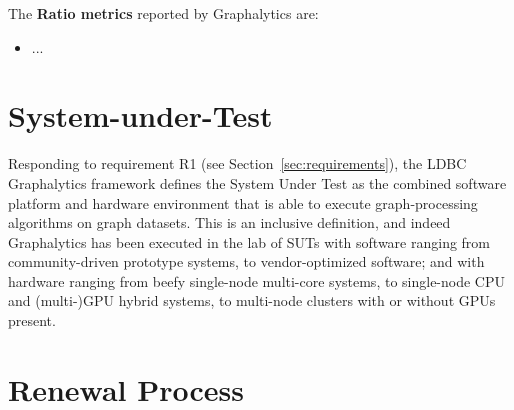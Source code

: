 The {\bf Ratio metrics} reported by Graphalytics are:

\begin{itemize}
	\item ...
\end{itemize}











\section{System-under-Test} \label{sec:sut}

Responding to requirement R1 (see Section~\ref{sec:requirements}), the LDBC Graphalytics framework defines the System Under Test as the combined software platform and hardware environment that is able to execute graph-processing algorithms on graph datasets. This is an inclusive definition, and indeed Graphalytics has been executed in the lab of SUTs with software ranging from community-driven prototype systems, to vendor-optimized software; and with hardware ranging from beefy single-node multi-core systems, to single-node CPU and (multi-)GPU hybrid systems, to multi-node clusters with or without GPUs present. 


\section{Renewal Process} \label{sec:renewal}

